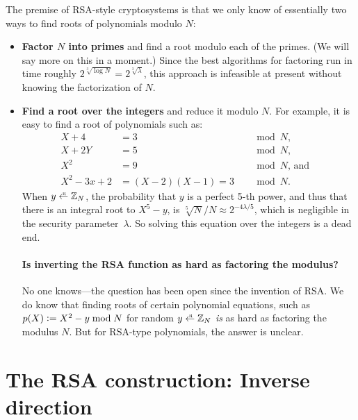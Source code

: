 The premise of RSA-style cryptosystems is that we only
know of essentially two ways to find roots of polynomials modulo $N$:
\begin{itemize}
\item \textbf{Factor $N$ into primes} and find a root modulo each of the primes.
      (We will say more on this in a moment.)
      Since the best algorithms for factoring run in time roughly $2^{\sqrt[3]{\log N}} = 2^{\sqrt[3]{\lambda}}$,
      this approach is infeasible at present without knowing the factorization of $N$.

\item \textbf{Find a root over the integers} and reduce it modulo $N$.
      For example, it is easy to find a root of polynomials such as:\\
\begin{align*}
  X + 4 &= 3 &&\mod N,&\\
  X + 2Y &= 5 &&\mod N,&\\
  X^2 &= 9 &&\mod N\text{, and}&\\
  X^2-3x+2 &= (X-2)(X-1) = 3 &&\mod N.
\end{align*}
When $y \getsr \Z_N$, the probability that $y$ is a perfect
5-th power, and thus that there is an integral root to $X^5 - y$,
is $\sqrt[5]{N}/N \approx 2^{-4\lambda/5}$, which is negligible
in the security parameter~$\lambda$.
So solving this equation over the integers is a dead end.

\paragraph{Is inverting the RSA function as hard as factoring the modulus?}
No one knows---the question has been open since the invention of RSA.
We do know that finding roots of certain polynomial equations, such as
$p(X) \mathrel{\mathop:}= X^2 - y \bmod N$ for random $y \getsr \Z_N$ \emph{is} as 
hard as factoring the modulus $N$.
But for RSA-type polynomials, the answer is unclear.

\end{itemize}

\section{The RSA construction: Inverse direction}

